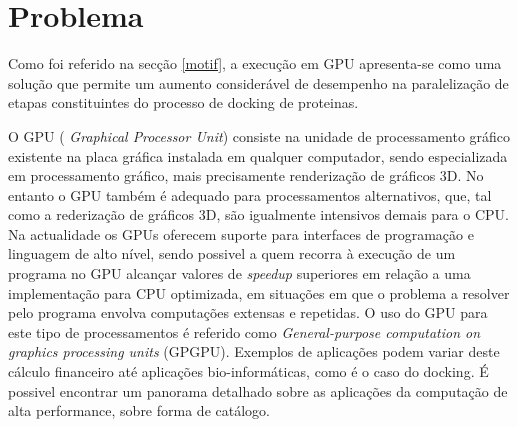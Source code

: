 \section{Problema}
%
%
 Como foi referido na secção \ref{motif}, a execução em GPU apresenta-se como uma solução que permite um aumento considerável de desempenho na paralelização de etapas constituintes do processo de docking de proteinas. \par
O GPU ( \textit{Graphical Processor Unit}) consiste na unidade de processamento gráfico existente na placa gráfica instalada em qualquer computador, sendo especializada em processamento gráfico, mais precisamente renderização de gráficos 3D.
 No entanto o GPU também é adequado para processamentos alternativos, que, tal como a rederização de gráficos 3D, são igualmente intensivos demais para o CPU. Na actualidade os GPUs oferecem suporte para interfaces de programação e linguagem de alto nível, sendo possivel a quem recorra à execução de um programa no GPU alcançar valores de \textit{speedup} superiores em relação a uma implementação para CPU optimizada, em situações em que o problema a resolver pelo programa envolva computações extensas e repetidas. O uso do GPU para este tipo de processamentos é referido como \textit{General-purpose computation on graphics processing units} (GPGPU)\cite{gpgpu}. Exemplos de aplicações podem variar deste cálculo financeiro até aplicações bio-informáticas, como é o caso do docking. É possivel encontrar um panorama detalhado sobre as aplicações da computação de alta performance, sobre forma de catálogo\cite{cudaIntro}.
